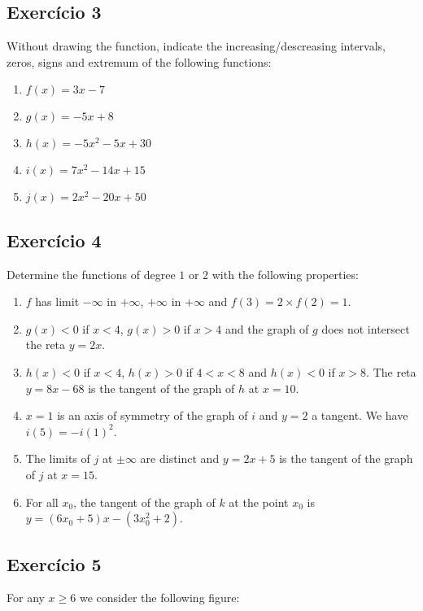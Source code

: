 \subsection*{Exercício 3}

Without drawing the function, indicate the increasing/descreasing intervals,
zeros, signs and extremum of the following functions:

\begin{enumerate}
\item $f(x) = 3x - 7$
\item $g(x) = -5x + 8$
\item $h(x) = -5x^2 - 5x + 30$
\item $i(x) = 7x^2 - 14x + 15$
\item $j(x) = 2x^2 -20x+50$
\end{enumerate}

\subsection*{Exercício 4}

Determine the functions of degree $1$ or $2$ with the following properties:

\begin{enumerate}
\item $f$ has limit $-\infty$ in $+\infty$, $+\infty$ in $+\infty$ and
  $f(3) = 2 \times {f(2)} = 1$.
\item $g(x) < 0$ if $x < 4$, $g(x) > 0$ if $x > 4$ and the graph of
  $g$ does not intersect the reta $y = 2x$.
\item $h(x) < 0$ if $x < 4$, $h(x) > 0$ if $4 < x < 8$ and
  $h(x) < 0$ if $x > 8$. The reta $y = 8x - 68$ is the tangent of
  the graph of $h$ at $x=10$.
\item $x = 1$ is an axis of symmetry of the graph of $i$ and
  $y = 2$ a tangent. We have $i(5) = -{i(1)}^2$.
\item The limits of $j$ at $\pm\infty$ are distinct and $y = 2x + 5$ is
  the tangent of the graph of $j$ at $x=15$.
\item For all $x_0$, the tangent of the graph of $k$ at the point $x_0$ is
  $y = {(6x_0+5)}x-{(3x_0^2+2)}$.
\end{enumerate}

\subsection*{Exercício 5}

For any $x \geq 6$ we consider the following figure:

